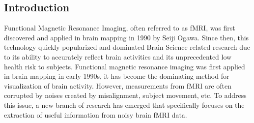 \documentclass[12pt]{article}
\begin{document}
\subsection{Introduction}
Functional Magnetic Resonance Imaging, often referred to as fMRI, was first discovered and applied in brain mapping in 1990 by Seiji Ogawa.\cite{Ogawa90} Since then, this technology quickly popularized and dominated Brain Science related research due to its ability to accurately reflect brain activities and its unprecedented low health risk to subjects. Functional magnetic resonance imaging was first applied in brain mapping in early 1990s, it has become the dominating method for visualization of brain activity. However, measurements from fMRI are often corrupted by noises created by misalignment, subject movement, etc. To address this issue, a new branch of research has emerged that specifically focuses on the extraction of useful information from noisy brain fMRI data.\\
\end{document}

